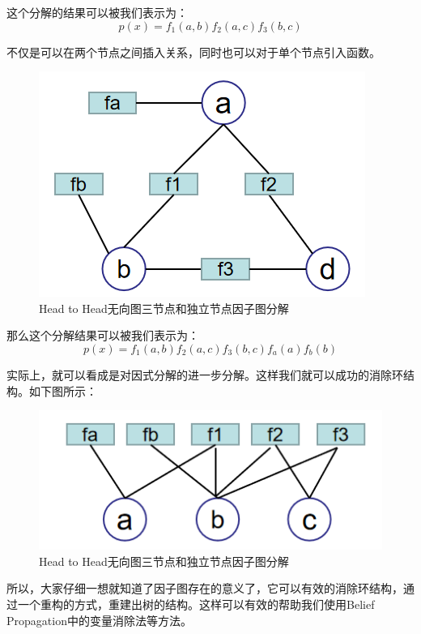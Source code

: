 \documentclass[a4paper]{article}
\begin{document}
这个分解的结果可以被我们表示为：
\begin{equation}
    p(x) = f_1(a,b)f_2(a,c)f_3(b,c)
\end{equation}

不仅是可以在两个节点之间插入关系，同时也可以对于单个节点引入函数。
\begin{figure}[H]
    \centering
    \includegraphics[width=.35\textwidth]{微信图片_20191212094923.png}
    \caption{Head to Head无向图三节点和独立节点因子图分解}
    \label{fig:my_label_1}
\end{figure}

那么这个分解结果可以被我们表示为：
\begin{equation}
    p(x) = f_1(a,b)f_2(a,c)f_3(b,c)f_a(a)f_b(b)
\end{equation}

实际上，就可以看成是对因式分解的进一步分解。这样我们就可以成功的消除环结构。如下图所示：
\begin{figure}[H]
    \centering
    \includegraphics[width=.35\textwidth]{微信图片_20191212100021.png}
    \caption{Head to Head无向图三节点和独立节点因子图分解}
    \label{fig:my_label_1}
\end{figure}

所以，大家仔细一想就知道了因子图存在的意义了，它可以有效的消除环结构，通过一个重构的方式，重建出树的结构。这样可以有效的帮助我们使用Belief Propagation中的变量消除法等方法。
\end{document}
